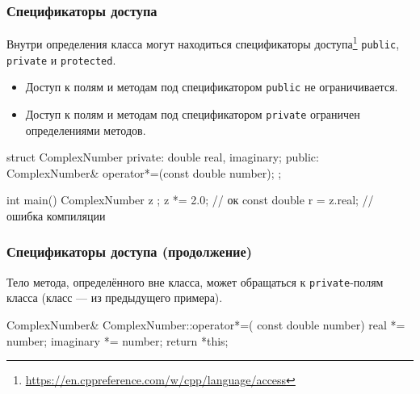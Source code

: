 \documentclass[compress, 8pt, aspectratio=169]{beamer}
\begin{document}
\begin{frame}[fragile]

    \frametitle{Спецификаторы доступа}

    \hfill\break
    Внутри определения класса могут находиться спецификаторы
    доступа\footnote{\url{https://en.cppreference.com/w/cpp/language/access}}
    \verb|public|, \verb|private| и \verb|protected|\footnotemark{}.


    \begin{itemize}
        \item Доступ к полям и методам под спецификатором \verb|public| не
            ограничивается.
        \item Доступ к полям и методам под спецификатором \verb|private|
            ограничен определениями методов.
    \end{itemize}

    \begin{myinplacelisting}[minted language=cpp]
struct ComplexNumber {
private:
    double real, imaginary;
public:
    ComplexNumber& operator*=(const double number);
};

int main() {
    ComplexNumber z {};
    z *= 2.0; // ок
    const double r = z.real; // ошибка компиляции
}
    \end{myinplacelisting}

\end{frame}

\begin{frame}[fragile]

    \frametitle{Спецификаторы доступа (продолжение)}

    Тело метода, определённого вне класса, может обращаться к
    \verb|private|-полям класса (класс — из предыдущего примера).

    \begin{myinplacelisting}[minted language=cpp]
ComplexNumber& ComplexNumber::operator*=(
        const double number) {
    real *= number;
    imaginary *= number;
    return *this;
}
    \end{myinplacelisting}

\end{frame}
\end{document}
